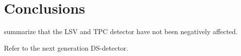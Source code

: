 \section{Conclusions}\label{sec:Conclusions}\label{sec:Conclusion}
summarize that the LSV and TPC detector have not been negatively affected.



Refer to the next generation DS-detector.
